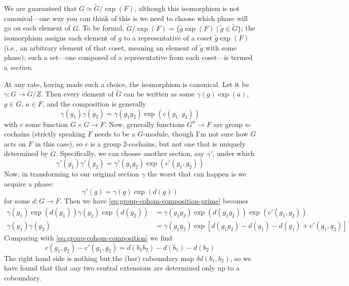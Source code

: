 \documentclass{report}
\begin{document}
We are guaranteed that $ G \simeq \tilde{G} / \exp(F)$, although this isomorphism 
is not canonical---one way you can think of this is we need to choose which
phase will go on each element of $ G $. To be formal,
$ \tilde{G} /\exp(F) = \{ \tilde{g} \exp(F) \mid \tilde{g}\in \tilde{G} \}$; 
the isomorphism assigns each element of $ g $ to a representative of a coset 
$ \tilde{g}\exp(F) $ (i.e., an arbitrary element of that coset, meaning an element 
of $ \tilde{g} $ with some phase); such a set---one composed of a representative 
from each coset---is termed a \textit{section}. 

At any rate, having made such a choice, the isomorphism is canonical. Let it be 
$ \gamma : G \to \tilde{G}/Z $. Then every element of $ \tilde{G} $ can be written 
as some $ \gamma(g)\exp(a) $, $ g\in G $, $ a\in F $, and the composition 
is generally 
\begin{equation}\label{eq:group-cohom-composition}
	\gamma(g_1)\gamma(g_2) = \gamma(g_1 g_2) \exp(c(g_1, g_2))
\end{equation}
with $ c $ some function $ G\times G \to F $.
Now, generally functions $ G^n \to F $ are group $ n $-cochains (strictly speaking 
$ F $ needs to be a $ G $-module, though I'm not sure how $ G $ acts on $ F $
in this case), so $ c $ is a group 2-cochains, but not one that is uniquely 
determined by $ \tilde{G} $. Specifically, we can choose another section, say 
$ \gamma' $, under which 
\begin{equation}\label{eq:group-cohom-composition-prime}
	\gamma'(g_1)\gamma'(g_2) = \gamma'(g_1 g_2) \exp(c'(g_1, g_2))
\end{equation}
Now, in transforming to our original section $ \gamma $ the worst that can 
happen is we acquire a phase: 
\begin{equation*}
	\gamma'(g) = \gamma(g) \exp(d(g))
\end{equation*}
for some $ d : G \to F $. Then we have \cref{eq:group-cohom-composition-prime} 
becomes 
\begin{align*}
	\gamma(g_1) \exp(d(g_1))\gamma(g_2)\exp(d (g_2)) &= \gamma(g_1 g_2) 
		\exp(d(g_1 g_2)) \exp(c'(g_1, g_2))\\ 
	\gamma(g_1) \gamma(g_2) &= \gamma(g_1 g_2) \exp\left[
		d(g_1 g_2) - d(g_1) - d(g_1) + c'(g_1, g_2)
	\right]
\end{align*}
Comparing with \cref{eq:group-cohom-composition} we find 
\begin{equation*}
	c(g_1, g_2) - c'(g_1, g_2) = d(b_1 b_2) - d(b_1) - d(b_2) 
\end{equation*}
The right hand side is nothing but the (bar) coboundary map $ \delta d(b_1, b_2) $, 
so we have found that that any two central extensions are determined only up to a 
coboundary.
\end{document}
